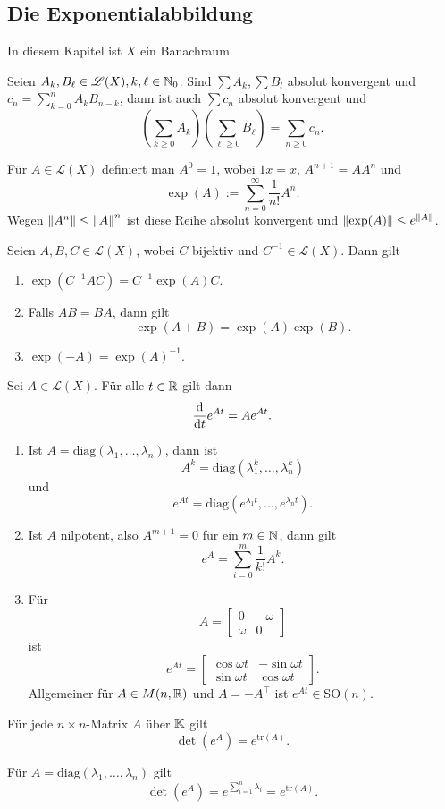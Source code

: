 \subsection{Die Exponentialabbildung}
In diesem Kapitel ist $X$ ein Banachraum.
\begin{satz}\label{satz4_10}
	Seien $A_k, B_\ell \in \mathscr{L}(X), k, \ell \in \mathbb{N}_0$. Sind $\sum A_k, \sum B_l$ absolut konvergent und $c_n = \sum_{k=0}^n A_k B_{n-k}$, dann ist auch $\sum c_n$ absolut konvergent und
	\[\left(\sum_{k\geq0} A_k\right)\left(\sum_{\ell \geq 0} B_\ell\right) = \sum_{n \geq 0} c_n.\]
\end{satz}
Für $A \in \mathscr{L}(X)$ definiert man $A^0 = 1$, wobei $1x = x$, $A^{n+1} = AA^n$ und
\[\exp(A) := \sum_{n = 0}^\infty \frac{1}{n!} A^n.\]
Wegen $\left\lVert A^n\right\rVert \leq \left\lVert A\right\rVert^n$ ist diese Reihe absolut konvergent und $\left\lVert\exp(A)\right\rVert \leq e^{\left\lVert A\right\rVert}$.
\begin{satz}\label{satz4_11}
	Seien $A, B, C \in \mathscr{L}(X)$, wobei $C$ bijektiv und $C^{-1} \in \mathscr{L}(X)$. Dann gilt
	\begin{enumerate}[label=(\alph*)]
		\item $\exp(C^{-1}AC) = C^{-1}\exp(A) C$.
		\item Falls $AB = BA$, dann gilt
		\[\exp(A + B) = \exp(A)\exp(B).\]
		\item $\exp(-A) = \exp(A)^{-1}$.
	\end{enumerate}
\end{satz}
\begin{satz}\label{satz4_12}
	Sei $A \in \mathscr{L}(X)$. Für alle $t \in \mathbb{R}$ gilt dann
	\[\frac{\mathrm{d}}{\mathrm{d} t} e^{At} = A e^{At}.\]
\end{satz}
\begin{beispiel}
	\begin{enumerate}[label=(\arabic*)]
		\item Ist $A = \mathrm{diag}(\lambda_1, \dots, \lambda_n)$, dann ist
		\[A^k = \mathrm{diag}(\lambda_1^k, \dots, \lambda_n^k)\]
		und 
		\[e^{At} = \mathrm{diag}(e^{\lambda_1 t}, \dots, e^{\lambda_n t}).\]
		\item Ist $A$ nilpotent, also $A^{m+1} = 0$ für ein $m \in \mathbb{N}$, dann gilt
		\[e^A = \sum_{i=0}^m \frac{1}{k!}A^k.\]
		\item Für 
		\[A = \begin{bmatrix}
			0 & - \omega\\
			\omega & 0 
		\end{bmatrix}\]
		ist
		\[e^{At} = \begin{bmatrix}
			\cos \omega t & -\sin \omega t\\
			\sin \omega t & \cos \omega t
		\end{bmatrix}.\]
		Allgemeiner für $A \in M(n, \mathbb{R})$ und $A = -A^\top$ ist $e^{At} \in \mathrm{SO}(n)$.
	\end{enumerate}
\end{beispiel}
\begin{satz}\label{satz4_13}
	Für jede $n \times n$-Matrix $A$ über $\mathbb{K}$ gilt
	\[\det(e^A) = e^{\mathrm{tr}(A)}.\]
\end{satz}
\begin{rem}
	Für $A = \mathrm{diag}(\lambda_1, \dots, \lambda_n)$ gilt
	\[\det(e^A) = e^{\sum_{i=1}^n \lambda_i} = e^{\mathrm{tr}(A)}.\]
\end{rem}